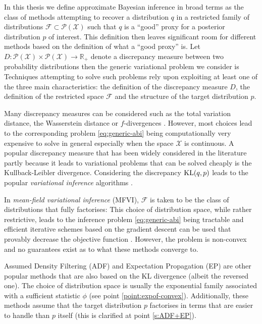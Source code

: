 
In this thesis we define approximate Bayesian inference in broad terms as the class of methods attempting to recover a distribution $q$ in a restricted family of distributions $\mathcal F\subset \mathcal P(\mathcal X)$ such that $q$ is a ``good'' proxy for a posterior distribution $p$ of interest. 
This definition then leaves significant room for different methods based on the definition of what a ``good proxy'' is. Let $D:\mathcal P(\mathcal X)\times \mathcal P(\mathcal X)\to \mathbb R_{+}$ denote a discrepancy measure between two probability distributions then the generic variational problem we consider is
%
%
Techniques attempting to solve such problems rely upon exploiting at least one of the three main characteristics: the definition of the discrepancy measure $D$, the definition of the restricted space $\mathcal F$ and the structure of the target distribution $p$. 

Many discrepancy measures can be considered such as the total variation distance, the Wasserstein distance or $f$-divergences \citep{minka04, blei16, li16, bernton17}. However, most choices lead to the corresponding problem \eqref{eq:generic-abi} being computationally very expensive to solve in general especially when the space $\mathcal X$ is continuous.
A popular discrepancy measure that has been widely considered in the literature partly because it leads to variational problems that can be solved cheaply is the Kullback-Leibler divergence. Considering the discrepancy $\mathrm{KL}\!\left(q,p\right)$ leads to the popular \emph{variational inference} algorithms \citep{blei16}. 


In \emph{mean-field variational inference} (MFVI), $\mathcal F$ is taken to be the class of distributions that fully factorises:
%
% 
This choice of distribution space, while rather restrictive, leads to the inference problem \eqref{eq:generic-abi} being tractable and efficient iterative schemes based on the gradient descent can be used that provably decrease the objective function \citep{hoffman13, kucukelbir16, blei16}. However, the problem is non-convex and no guarantees exist as to what these methods converge to.

Assumed Density Filtering (ADF) and Expectation Propagation (EP) are other popular methods that are also based on the KL divergence (albeit the reversed one). The choice of distribution space is usually the exponential family associated with a sufficient statistic $\phi$ (see point \ref{point:expof-convex}). Additionally, these methods assume that the target distribution $p$ factorises in terms that are easier to handle than $p$ itself (this is clarified at point \ref{s:ADF+EP}).

